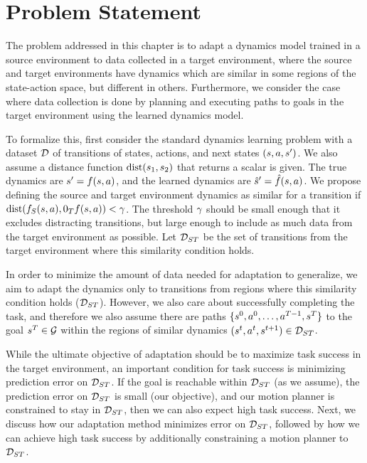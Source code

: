 \section{Problem Statement} \label{ICRA:sec:problem_statement}

The problem addressed in this chapter is to adapt a dynamics model trained in a source environment to data collected in a target environment, where the source and target environments have dynamics which are similar in some regions of the state-action space, but different in others. Furthermore, we consider the case where data collection is done by planning and executing paths to goals in the target environment using the learned dynamics model.

To formalize this, first consider the standard dynamics learning problem with a dataset $\mathcal{D}$ of transitions of states, actions, and next states $(s,a,s')$. We also assume a distance function $\mathrm{dist}(s_1,s_2)$ that returns a scalar is given. The true dynamics are $s'=f(s,a)$, and the learned dynamics are $\hat{s}'=\hat{f}(s,a)$. We propose defining the source and target environment dynamics as similar for a transition if $\distf{\sourceDynamics(\state,\action)}{\targetDynamics(\state,\action)} < \softFilteringThrehsold$. The threshold $\gamma$ should be small enough that it excludes distracting transitions, but large enough to include as much data from the target environment as possible. Let $\mathcal{D}_{ST}$ be the set of transitions from the target environment where this similarity condition holds.

In order to minimize the amount of data needed for adaptation to generalize, we aim to adapt the dynamics only to transitions from regions where this similarity condition holds ($\mathcal{D}_{ST}$). However, we also care about successfully completing the task, and therefore we also assume there are paths $\{s^0,a^0,\dots,a^{T-1},s^T\}$ to the goal $s^T\in\mathcal{G}$ within the regions of similar dynamics $(s^t,a^t,s^{t+1}) \in \mathcal{D}_{ST} $.

While the ultimate objective of adaptation should be to maximize task success in the target environment, an important condition for task success is minimizing prediction error on $\mathcal{D}_{ST}$. If the goal is reachable within $\mathcal{D}_{ST}$ (as we assume), the prediction error on $\mathcal{D}_{ST}$ is small (our objective), and our motion planner is constrained to stay in $\mathcal{D}_{ST}$, then we can also expect high task success. Next, we discuss how our adaptation method minimizes error on $\mathcal{D}_{ST}$, followed by how we can achieve high task success by additionally constraining a motion planner to $\mathcal{D}_{ST}$.

